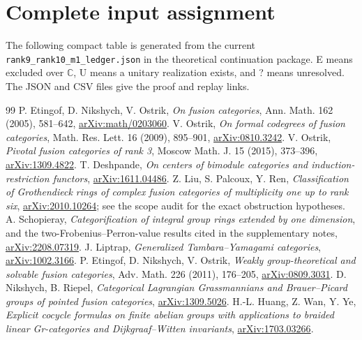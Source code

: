 \documentclass[11pt]{article}
\newcommand{\C}{\mathbb C}
\theoremstyle{remark}\newtheorem{remark}[proposition]{Remark}
\begin{document}
\appendix
\section{Complete input assignment}
The following compact table is generated from the current
\nolinkurl{rank9_rank10_m1_ledger.json} in the theoretical continuation package.
E means excluded over $\C$, U means a unitary realization exists, and
? means unresolved. The JSON and CSV files give the proof and replay links.


\begin{thebibliography}{99}
 P. Etingof, D. Nikshych, V. Ostrik,
\emph{On fusion categories}, Ann. Math. 162 (2005), 581--642,
\href{https://arxiv.org/abs/math/0203060}{arXiv:math/0203060}.
 V. Ostrik, \emph{On formal codegrees of fusion
categories}, Math. Res. Lett. 16 (2009), 895--901,
\href{https://arxiv.org/abs/0810.3242}{arXiv:0810.3242}.
 V. Ostrik, \emph{Pivotal fusion categories of rank 3},
Moscow Math. J. 15 (2015), 373--396,
\href{https://arxiv.org/abs/1309.4822}{arXiv:1309.4822}.
 T. Deshpande, \emph{On centers of bimodule categories
and induction-restriction functors},
\href{https://arxiv.org/abs/1611.04486}{arXiv:1611.04486}.
 Z. Liu, S. Palcoux, Y. Ren, \emph{Classification of Grothendieck
rings of complex fusion categories of multiplicity one up to rank six},
\href{https://arxiv.org/abs/2010.10264}{arXiv:2010.10264}; see the scope
audit for the exact obstruction hypotheses.
 A. Schopieray, \emph{Categorification of integral
group rings extended by one dimension}, and the two-Frobenius--Perron-value
results cited in the supplementary notes,
\href{https://arxiv.org/abs/2208.07319}{arXiv:2208.07319}.
 J. Liptrap, \emph{Generalized Tambara--Yamagami categories},
\href{https://arxiv.org/abs/1002.3166}{arXiv:1002.3166}.
 P. Etingof, D. Nikshych, V. Ostrik,
\emph{Weakly group-theoretical and solvable fusion categories},
Adv. Math. 226 (2011), 176--205,
\href{https://arxiv.org/abs/0809.3031}{arXiv:0809.3031}.
 D. Nikshych, B. Riepel, \emph{Categorical Lagrangian
Grassmannians and Brauer--Picard groups of pointed fusion categories},
\href{https://arxiv.org/abs/1309.5026}{arXiv:1309.5026}.
 H.-L. Huang, Z. Wan, Y. Ye, \emph{Explicit cocycle formulas
on finite abelian groups with applications to braided linear Gr-categories
and Dijkgraaf--Witten invariants},
\href{https://arxiv.org/abs/1703.03266}{arXiv:1703.03266}.

\end{thebibliography}
\end{document}
